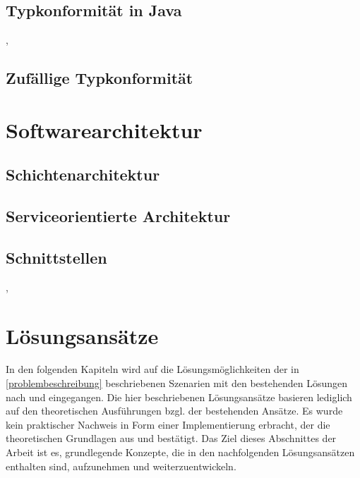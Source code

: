 \documentclass[11pt, 
ngerman,
doublespacing,
chapterinoneline, %
consistentlayout, %
]{scrartcl}
\begin{document}
\subsection{Typkonformität in Java}
\cite{structconfjava}, \cite{compoundtypes}
\subsection{Zufällige Typkonformität}
\cite{structconfjava}
\section{Softwarearchitektur}
\cite{Bas13}
\subsection{Schichtenarchitektur}\label{architektur}
\cite{modanwendungen}
\subsection{Serviceorientierte Architektur}\label{sarchitektur}
\cite{modanwendungen}
\subsection{Schnittstellen}
\cite{Bas13}, \cite{Bus96}
\section{Lösungsansätze}
In den folgenden Kapiteln wird auf die Lösungsmöglichkeiten der in \ref{problembeschreibung} beschriebenen Szenarien mit den bestehenden Lösungen nach \cite{structconfjava} und \cite{whiteoak} eingegangen. Die hier beschrie\-benen Lösungsansätze basieren lediglich auf den theoretischen Ausführungen bzgl. der bestehenden Ansätze. Es wurde kein praktischer Nachweis in Form einer Implementierung erbracht, der die theoretischen Grundlagen aus \cite{structconfjava} und \cite{whiteoak} bestätigt. Das Ziel dieses Abschnittes der Arbeit ist es, grundlegende Konzepte, die in den nachfolgenden Lösungs\-ansätzen enthalten sind, aufzunehmen und weiterzuentwickeln.
\end{document}
